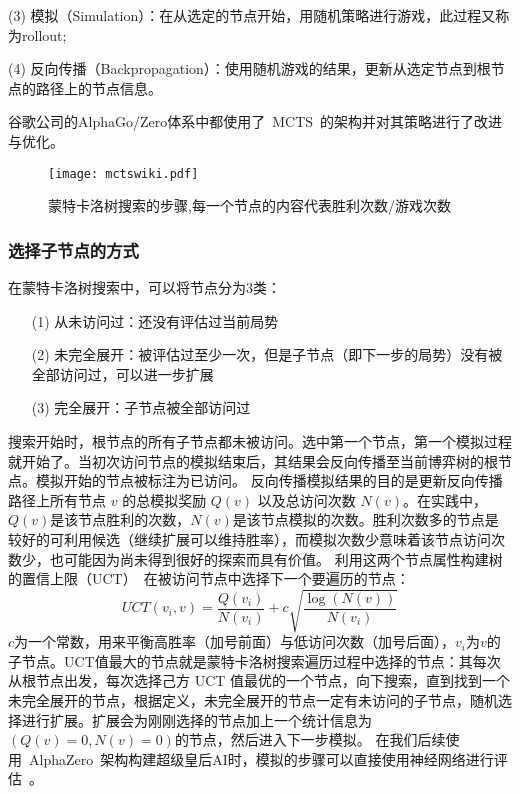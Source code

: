 (3) 模拟（Simulation）：在从选定的节点开始，用随机策略进行游戏，此过程又称为rollout;

(4) 反向传播（Backpropagation）：使用随机游戏的结果，更新从选定节点到根节点的路径上的节点信息。

谷歌公司的AlphaGo/Zero体系中都使用了~MCTS~的架构并对其策略进行了改进与优化。

\begin{figure}[htb]
    \centering
    \texttt{[image: mctswiki.pdf]}
    \caption[mcts]{%
    蒙特卡洛树搜索的步骤,每一个节点的内容代表胜利次数/游戏次数~\cite{RePEc:wsi:nmncxx:v:04:y:2008:i:03:n:s1793005708001094}%
      }
    \label{fig:mcts}
\end{figure}

\subsubsection{选择子节点的方式}
在蒙特卡洛树搜索中，可以将节点分为3类：

\begin{itemize}
    \item [(1)] 
    从未访问过：还没有评估过当前局势
    \item [(2)]
    未完全展开：被评估过至少一次，但是子节点（即下一步的局势）没有被全部访问过，可以进一步扩展
    \item [(3)]
    完全展开：子节点被全部访问过
\end{itemize}

搜索开始时，根节点的所有子节点都未被访问。选中第一个节点，第一个模拟过程就开始了。当初次访问节点的模拟结束后，其结果会反向传播至当前博弈树的根节点。模拟开始的节点被标注为已访问。
反向传播模拟结果的目的是更新反向传播路径上所有节点 $v$ 的总模拟奖励 $Q(v)$ 以及总访问次数 $N(v)$。在实践中，$Q(v)$是该节点胜利的次数，$N(v)$是该节点模拟的次数。胜利次数多的节点是较好的可利用候选（继续扩展可以维持胜率），而模拟次数少意味着该节点访问次数少，也可能因为尚未得到很好的探索而具有价值。
利用这两个节点属性构建树的置信上限（UCT）~\cite{10.1007/11871842_29}在被访问节点中选择下一个要遍历的节点：
\begin{equation*}
    UCT(v_{i},v) = \frac{Q(v_{i})}{N(v_{i})} + c\sqrt{\frac{\log(N(v))}{N(v_{i})}}
\end{equation*}
$c$为一个常数，用来平衡高胜率（加号前面）与低访问次数（加号后面），$v_{i}$为$v$的子节点。UCT值最大的节点就是蒙特卡洛树搜索遍历过程中选择的节点：其每次从根节点出发，每次选择己方 UCT 值最优的一个节点，向下搜索，直到找到一个未完全展开的节点，根据定义，未完全展开的节点一定有未访问的子节点，随机选择进行扩展。扩展会为刚刚选择的节点加上一个统计信息为$(Q(v)=0,N(v)=0)$的节点，然后进入下一步模拟。
在我们后续使用~AlphaZero~架构构建超级皇后AI时，模拟的步骤可以直接使用神经网络进行评估~\cite{Silver1140,Silver2017,Silver2016}。

